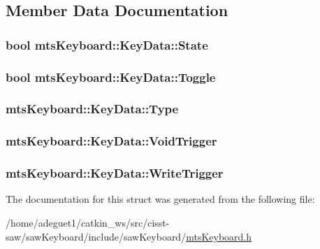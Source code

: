 \subsection{Member Data Documentation}
\hypertarget{structmts_keyboard_1_1_key_data_a5903bc84ec70c923b46a43326ef55009}{
\subsubsection[{State}]{\setlength{\rightskip}{0pt plus 5cm}bool mts\-Keyboard\-::\-Key\-Data\-::\-State}}\label{structmts_keyboard_1_1_key_data_a5903bc84ec70c923b46a43326ef55009}
\hypertarget{structmts_keyboard_1_1_key_data_a7a7e12ddde72dfaa2f297a3a706d79e6}{
\subsubsection[{Toggle}]{\setlength{\rightskip}{0pt plus 5cm}bool mts\-Keyboard\-::\-Key\-Data\-::\-Toggle}}\label{structmts_keyboard_1_1_key_data_a7a7e12ddde72dfaa2f297a3a706d79e6}
\hypertarget{structmts_keyboard_1_1_key_data_ab2b6df8b50b8ada66a61e6412644e0d3}{
\subsubsection[{Type}]{ mts\-Keyboard\-::\-Key\-Data\-::\-Type}}\label{structmts_keyboard_1_1_key_data_ab2b6df8b50b8ada66a61e6412644e0d3}
\hypertarget{structmts_keyboard_1_1_key_data_a560e2370eb7f17e4c784e81d228e514a}{
\subsubsection[{Void\-Trigger}]{ mts\-Keyboard\-::\-Key\-Data\-::\-Void\-Trigger}}\label{structmts_keyboard_1_1_key_data_a560e2370eb7f17e4c784e81d228e514a}
\hypertarget{structmts_keyboard_1_1_key_data_a564f0bb039d8cd597235a73b9f06cf4c}{
\subsubsection[{Write\-Trigger}]{ mts\-Keyboard\-::\-Key\-Data\-::\-Write\-Trigger}}\label{structmts_keyboard_1_1_key_data_a564f0bb039d8cd597235a73b9f06cf4c}


The documentation for this struct was generated from the following file\-:\begin{DoxyCompactItemize}
\item 
/home/adeguet1/catkin\-\_\-ws/src/cisst-\/saw/saw\-Keyboard/include/saw\-Keyboard/\hyperlink{mts_keyboard_8h}{mts\-Keyboard.\-h}\end{DoxyCompactItemize}
